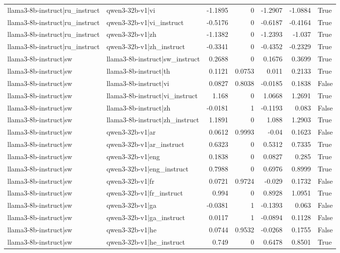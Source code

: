 \begin{table}
\begin{tabular}{l l r r r r l}
llama3-8b-instruct|ru_instruct & qwen3-32b-v1|vi & -1.1895 & 0 & -1.2907 & -1.0884 & True \\
llama3-8b-instruct|ru_instruct & qwen3-32b-v1|vi_instruct & -0.5176 & 0 & -0.6187 & -0.4164 & True \\
llama3-8b-instruct|ru_instruct & qwen3-32b-v1|zh & -1.1382 & 0 & -1.2393 & -1.037 & True \\
llama3-8b-instruct|ru_instruct & qwen3-32b-v1|zh_instruct & -0.3341 & 0 & -0.4352 & -0.2329 & True \\
llama3-8b-instruct|sw & llama3-8b-instruct|sw_instruct & 0.2688 & 0 & 0.1676 & 0.3699 & True \\
llama3-8b-instruct|sw & llama3-8b-instruct|th & 0.1121 & 0.0753 & 0.011 & 0.2133 & True \\
llama3-8b-instruct|sw & llama3-8b-instruct|vi & 0.0827 & 0.8038 & -0.0185 & 0.1838 & False \\
llama3-8b-instruct|sw & llama3-8b-instruct|vi_instruct & 1.168 & 0 & 1.0668 & 1.2691 & True \\
llama3-8b-instruct|sw & llama3-8b-instruct|zh & -0.0181 & 1 & -0.1193 & 0.083 & False \\
llama3-8b-instruct|sw & llama3-8b-instruct|zh_instruct & 1.1891 & 0 & 1.088 & 1.2903 & True \\
llama3-8b-instruct|sw & qwen3-32b-v1|ar & 0.0612 & 0.9993 & -0.04 & 0.1623 & False \\
llama3-8b-instruct|sw & qwen3-32b-v1|ar_instruct & 0.6323 & 0 & 0.5312 & 0.7335 & True \\
llama3-8b-instruct|sw & qwen3-32b-v1|eng & 0.1838 & 0 & 0.0827 & 0.285 & True \\
llama3-8b-instruct|sw & qwen3-32b-v1|eng_instruct & 0.7988 & 0 & 0.6976 & 0.8999 & True \\
llama3-8b-instruct|sw & qwen3-32b-v1|fr & 0.0721 & 0.9724 & -0.029 & 0.1732 & False \\
llama3-8b-instruct|sw & qwen3-32b-v1|fr_instruct & 0.994 & 0 & 0.8928 & 1.0951 & True \\
llama3-8b-instruct|sw & qwen3-32b-v1|ga & -0.0381 & 1 & -0.1393 & 0.063 & False \\
llama3-8b-instruct|sw & qwen3-32b-v1|ga_instruct & 0.0117 & 1 & -0.0894 & 0.1128 & False \\
llama3-8b-instruct|sw & qwen3-32b-v1|he & 0.0744 & 0.9532 & -0.0268 & 0.1755 & False \\
llama3-8b-instruct|sw & qwen3-32b-v1|he_instruct & 0.749 & 0 & 0.6478 & 0.8501 & True \\

\end{tabular}
\end{table}
